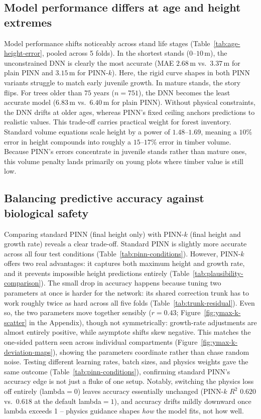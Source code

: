 \documentclass[logo,msc,ai]{infthesis}           %
\begin{document}
\subsection{Model performance differs at age and height extremes}
Model performance shifts noticeably across stand life stages (Table~\ref{tab:age-height-error}, pooled across 5 folds). In the shortest stands ($0$--$10$\,m), the unconstrained DNN is clearly the most accurate (MAE $2.68$\,m vs.\ $3.37$\,m for plain PINN and $3.15$\,m for PINN-$k$). Here, the rigid curve shapes in both PINN variants struggle to match early juvenile growth. In mature stands, the story flips. For trees older than $75$ years ($n = 751$), the DNN becomes the least accurate model ($6.83$\,m vs.\ $6.40$\,m for plain PINN). Without physical constraints, the DNN drifts at older ages, whereas PINN's fixed ceiling anchors predictions to realistic values. This trade-off carries practical weight for forest inventory. Standard volume equations scale height by a power of $1.48$--$1.69$, meaning a $10$\% error in height compounds into roughly a $15$--$17$\% error in timber volume. Because PINN's errors concentrate in juvenile stands rather than mature ones, this volume penalty lands primarily on young plots where timber value is still low.

\subsection{Balancing predictive accuracy against biological safety}
Comparing standard PINN (final height only) with PINN-$k$ (final height and growth rate) reveals a clear trade-off. Standard PINN is slightly more accurate across all four test conditions (Table~\ref{tab:pinn-conditions}). However, PINN-$k$ offers two real advantages: it captures both maximum height and growth rate, and it prevents impossible height predictions entirely (Table~\ref{tab:plausibility-comparison}). The small drop in accuracy happens because tuning two parameters at once is harder for the network: its shared correction trunk has to work roughly twice as hard across all five folds (Table~\ref{tab:trunk-residual}). Even so, the two parameters move together sensibly ($r = 0.43$; Figure~\ref{fig:ymax-k-scatter} in the Appendix), though not symmetrically: growth-rate adjustments are almost entirely positive, while asymptote shifts skew negative. This matches the one-sided pattern seen across individual compartments (Figure~\ref{fig:ymax-k-deviation-maps}), showing the parameters coordinate rather than chase random noise. Testing different learning rates, batch sizes, and physics weights gave the same outcome (Table~\ref{tab:pinn-conditions}), confirming standard PINN's accuracy edge is not just a fluke of one setup. Notably, switching the physics loss off entirely (lambda$=0$) leaves accuracy essentially unchanged (PINN-$k$ $R^2$ $0.620$ vs.\ $0.618$ at the default lambda$=1$), and accuracy drifts mildly downward once lambda exceeds 1 -- physics guidance shapes \emph{how} the model fits, not how well.
\end{document}
